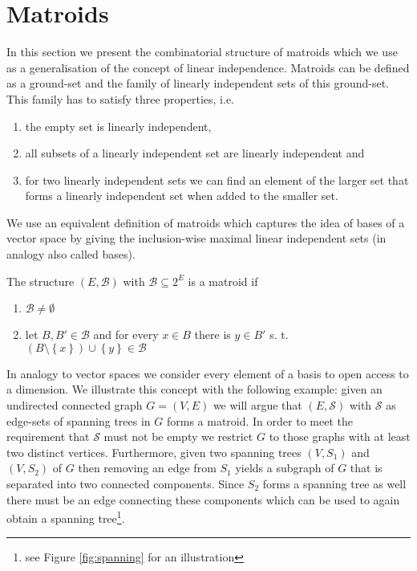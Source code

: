 \documentclass{scrartcl}
\theoremstyle{nonumberplain}
\newcommand{\tupel}[1]{\left(#1\right)}
\newcommand{\set}[1]{\left\{#1\right\}}
\begin{document}
\section{Matroids}
In this section we present the combinatorial structure of matroids
which we use as a generalisation of the concept of linear independence.
Matroids can be defined as a ground-set and the family of linearly
independent sets of this ground-set. This family has to satisfy three
properties, i.e.
\begin{enumerate}
  \item the empty set is linearly independent,
  \item all subsets of a linearly independent set are linearly independent and
  \item for two linearly independent sets we can find an element of the larger
    set that forms a linearly independent set when added to the smaller set.
\end{enumerate}
We use an equivalent definition of matroids which captures the idea of
bases of a vector space by giving the inclusion-wise maximal linear independent
sets (in analogy also called bases).
\begin{defi}
  The structure $\tupel{E, \mathcal{B}}$ with $\mathcal{B}\subseteq 2^{E}$ is
  a matroid if
  \begin{enumerate}
    \item $\mathcal{B}\neq\emptyset$
    \item let $B,B'\in\mathcal{B}$ and for every $x\in B$ there is $y\in B'$
      s. t. $(B\setminus\set{x})\cup\set{y}\in\mathcal{B}$
  \end{enumerate}
\end{defi}
In analogy to vector spaces we consider every element of a basis to open access
to a dimension. We illustrate this concept with the following example: given an
undirected connected graph $G = \tupel{V, E}$ we will argue that
$\tupel{E, \mathcal{S}}$ with $\mathcal{S}$ as edge-sets of spanning trees
in $G$ forms a matroid. In order to meet the requirement that $\mathcal{S}$
must not be empty we restrict $G$ to those graphs with at least two distinct
vertices. Furthermore, given two spanning trees $\tupel{V, S_{1}}$ and
$\tupel{V, S_{2}}$ of $G$ then removing an edge from $S_{1}$ yields a subgraph
of $G$ that is separated into two connected components. Since $S_{2}$ forms a
spanning tree as well there must be an edge connecting these components which
can be used to again obtain a spanning tree\footnote{see Figure
\ref{fig:spanning} for an illustration}.
\end{document}
